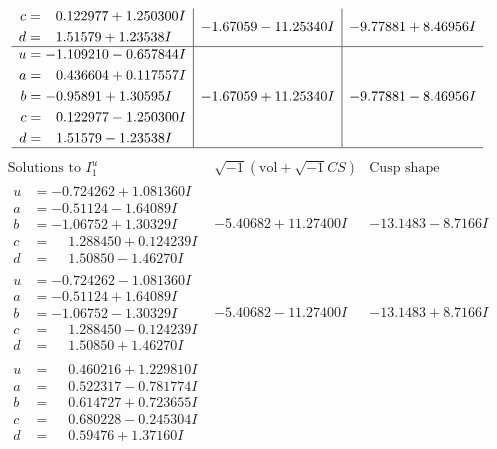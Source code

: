 \documentclass[1p]{elsarticle_modified}
\theoremstyle{definition}
\newcommand{\I}{\sqrt{-1}}
\begin{document}
$$\begin{array}{c|c|c}
\begin{aligned}
c &= \phantom{-}0.122977 + 1.250300 I \\
d &= \phantom{-}1.51579 + 1.23538 I\end{aligned}
 & -1.67059 - 11.25340 I & -9.77881 + 8.46956 I \\ \hline\begin{aligned}
u &= -1.109210 - 0.657844 I \\
a &= \phantom{-}0.436604 + 0.117557 I \\
b &= -0.95891 + 1.30595 I \\
c &= \phantom{-}0.122977 - 1.250300 I \\
d &= \phantom{-}1.51579 - 1.23538 I\end{aligned}
 & -1.67059 + 11.25340 I & -9.77881 - 8.46956 I\\
 \hline 
 \end{array}$$\newpage$$\begin{array}{c|c|c}  
\text{Solutions to }I^u_{1}& \I (\text{vol} + \sqrt{-1}CS) & \text{Cusp shape}\\
 \hline 
\begin{aligned}
u &= -0.724262 + 1.081360 I \\
a &= -0.51124 - 1.64089 I \\
b &= -1.06752 + 1.30329 I \\
c &= \phantom{-}1.288450 + 0.124239 I \\
d &= \phantom{-}1.50850 - 1.46270 I\end{aligned}
 & -5.40682 + 11.27400 I & -13.1483 - 8.7166 I \\ \hline\begin{aligned}
u &= -0.724262 - 1.081360 I \\
a &= -0.51124 + 1.64089 I \\
b &= -1.06752 - 1.30329 I \\
c &= \phantom{-}1.288450 - 0.124239 I \\
d &= \phantom{-}1.50850 + 1.46270 I\end{aligned}
 & -5.40682 - 11.27400 I & -13.1483 + 8.7166 I \\ \hline\begin{aligned}
u &= \phantom{-}0.460216 + 1.229810 I \\
a &= \phantom{-}0.522317 - 0.781774 I \\
b &= \phantom{-}0.614727 + 0.723655 I \\
c &= \phantom{-}0.680228 - 0.245304 I \\
d &= \phantom{-}0.59476 + 1.37160 I\end{aligned}

\end{array}$$
\end{document}
